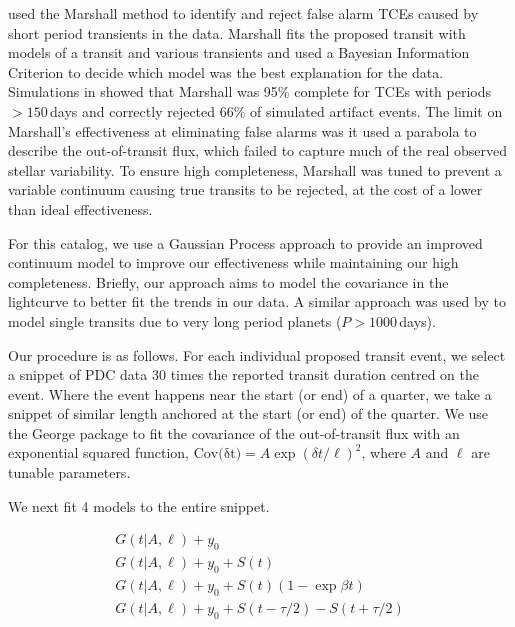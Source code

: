 
\citet{Coughlin2016} used the Marshall method \citep{Mullally16} to identify and reject false alarm TCEs caused by short period transients in the data. Marshall fits the proposed transit with models of a transit and various transients and used a Bayesian Information Criterion to decide which model was the best explanation for the data. Simulations in \citet{Mullally16} showed that Marshall was 95\% complete for TCEs with periods $>150$\,days and correctly rejected 66\% of simulated artifact events. The limit on Marshall's effectiveness at eliminating false alarms was it used a parabola to describe the out-of-transit flux, which failed to capture much of the real observed stellar variability. To ensure high completeness, Marshall was tuned to prevent a variable continuum causing true transits to be rejected, at the cost of a lower than ideal effectiveness.

For this catalog, we use a Gaussian Process approach \citep[GP][]{Rasmussen10} to provide an improved continuum model to improve our effectiveness while maintaining our high completeness. Briefly, our approach aims to model the covariance in the lightcurve to better fit the trends in our data.
A similar approach was used by \citet{ForemanMackey16} to model single transits due to very long period planets ($P > 1000$\,days).

Our procedure is as follows. For each individual proposed transit event, we select a snippet of PDC data 30 times the reported transit duration centred on the event. Where the event happens near the start (or end) of a quarter, we take a snippet of similar length anchored at the start (or end) of the quarter. We use the George package \citep{Ambikasaran14} to fit the covariance of the out-of-transit flux with an exponential squared function, $ {\mathrm{Cov(\delta t})} = A \exp{ (\delta t/\ell)^2}$, where $A$ and $\ell$ are tunable parameters. 

We next fit 4 models to the entire snippet.

\begin{equation}
\left.\begin{aligned}
G(t | A, \ell) + y_0 \\
G(t | A, \ell) + y_0 + S(t)\\
G(t | A, \ell) + y_0 + S(t)(1 - \exp{\beta t})\\
G(t | A, \ell) + y_0 + S(t - \tau/2) - S(t + \tau/2) 
\end{aligned}\right.
\end{equation}

